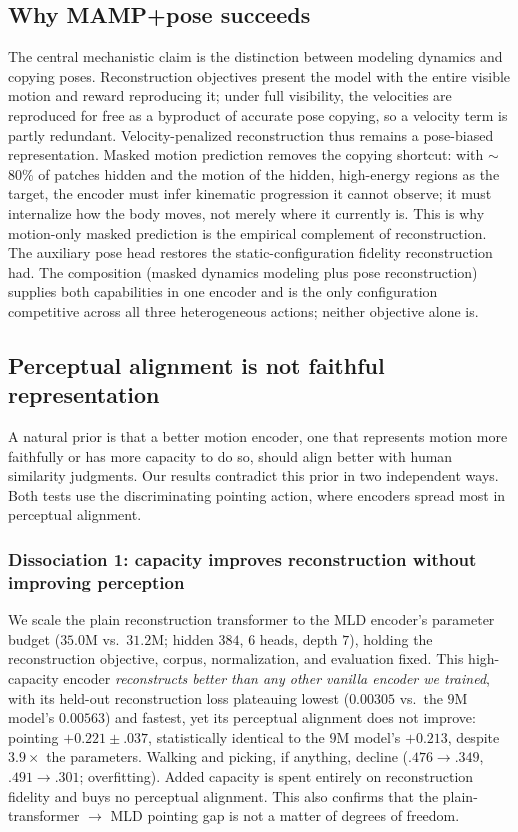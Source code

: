 \documentclass[letterpaper]{article} %
\begin{document}
\subsection{Why MAMP+pose succeeds}
The central mechanistic claim is the distinction between {modeling} dynamics and
{copying} poses. Reconstruction objectives present the model with the entire visible motion
and reward reproducing it; under full visibility, the velocities are reproduced for free as a
byproduct of accurate pose copying, so a velocity term is partly redundant. Velocity-penalized
reconstruction thus remains a {pose-biased} representation. Masked motion prediction removes
the copying shortcut: with $\sim$80\% of patches hidden and the motion of the hidden, high-energy
regions as the target, the encoder must infer kinematic progression it cannot observe; it must
internalize how the body moves, not merely where it currently is. This is why motion-only masked
prediction is the empirical complement of reconstruction. The auxiliary pose head restores the
static-configuration fidelity reconstruction had. The {composition} (masked dynamics
modeling plus pose reconstruction) supplies both capabilities in one encoder and is the only
configuration competitive across all three heterogeneous actions; neither objective alone is.

\subsection{Perceptual alignment is not faithful representation}
\label{sec:dissociation}
A natural prior is that a better motion encoder, one that represents motion more faithfully or has
more capacity to do so, should align better with human similarity judgments. Our results contradict
this prior in two independent ways. Both tests use the discriminating pointing action, where encoders
spread most in perceptual alignment.

\subsubsection{Dissociation 1: capacity improves reconstruction without improving perception}
We scale the plain reconstruction transformer to the MLD encoder's parameter budget
($35.0$M vs.\ $31.2$M; hidden $384$, $6$ heads, depth $7$), holding the reconstruction objective,
corpus, normalization, and evaluation fixed. This high-capacity encoder \emph{reconstructs better
than any other vanilla encoder we trained}, with its held-out reconstruction loss plateauing lowest
($0.00305$ vs.\ the $9$M model's $0.00563$) and fastest, yet its perceptual alignment does not
improve: pointing $+0.221 {\scriptstyle\pm} .037$, statistically identical to the $9$M model's
$+0.213$, despite $3.9\times$ the parameters. Walking and picking, if anything, decline
($.476\!\to\!.349$, $.491\!\to\!.301$; overfitting). Added capacity is spent entirely on
reconstruction fidelity and buys no perceptual alignment. This also confirms that the
plain-transformer $\to$ MLD pointing gap is not a matter of degrees of freedom.
\end{document}

